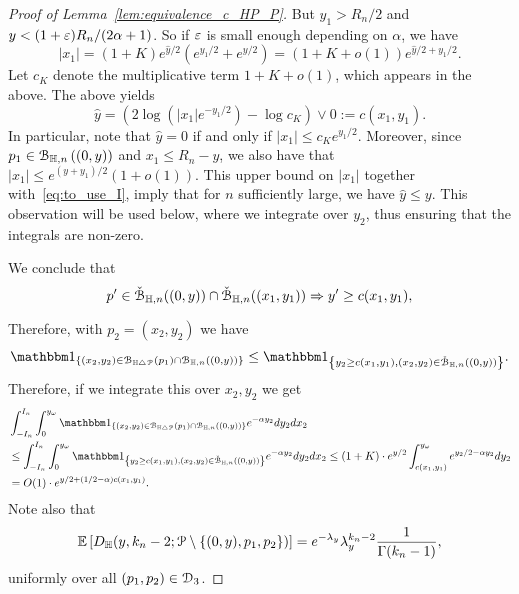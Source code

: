 \begin{proof}[Proof of Lemma~\ref{lem:equivalence_c_HP_P}]
But $y_1 > R_n/2$ and $y< (1+\varepsilon) R_n /(2\alpha +1)$. So if $\varepsilon$ is small enough depending on $\alpha$, we have 
$$ |x_1| =(1+K) e^{\hat{y}/2} \left( e^{y_1/2} + e^{y/2} \right) = (1+K+o(1))e^{\hat{y}/2 + y_1/2}. $$
Let $c_K$ denote the multiplicative term $1+ K+o(1)$, which appears in the above.
The above yields
\begin{equation} \label{eq:to_use_I}
\hat{y}= \left(2 \log(|x_1|e^{-y_1/2}) - \log c_K \right) \vee 0 := c(x_1,y_1). 
\end{equation}
In particular, note that $\hat{y} = 0$ if and only if $|x_1| \leq c_K e^{y_1/2}$.  
Moreover, since $p_1 \in {\mathcal B}_{\mathbb{H},n}\left((0,y)\right)$ and $x_1 \leq R_n - y$, we also have that 
$|x_1| \leq e^{(y+y_1)/2} (1+o(1))$. This upper bound on $|x_1|$ together with~\eqref{eq:to_use_I}, imply that for $n$ sufficiently large, we have $\hat{y} \leq y$. This observation will be used below, where 
we integrate over $y_2$, thus ensuring that the integrals are non-zero. 

We conclude that 
\begin{equation*}\label{eq:intersex_approx}
	p^\prime \in \check{{\mathcal B}}_{\mathbb{H},n}((0,y))\cap \check{{\mathcal B}}_{\mathbb{H},n}((x_1,y_1)) \Rightarrow y^\prime \ge c(x_1,y_1),
\end{equation*}

Therefore, with $p_2 = (x_2,y_2)$ we have 
\begin{equation} \label{eq:symdiff_loc}
\begin{split} 
 \ind{(x_2,y_2) \in \BallSym{p_1}\cap \BallHyp{(0,y)}} \leq \ind{y_2 \geq c(x_1,y_1), (x_2,y_2) \in \FatBallHyp{(0,y)}}.
\end{split}
\end{equation}
Therefore, if we integrate this over $x_2, y_2$ we get 
\begin{equation*}
\begin{split}
&\int_{-I_n}^{I_n} \int_{0}^{y_\omega}  \ind{(x_2,y_2) \in \BallSym{p_1}\cap \BallHyp{(0,y)}}  
e^{-\alpha y_2} dy_2 dx_2\\
&  \leq 
\int_{-I_n}^{I_n} \int_{0}^{y_\omega}  \ind{y_2 \geq c(x_1,y_1), (x_2,y_2) \in \FatBallHyp{(0,y)}}  
e^{-\alpha y_2} dy_2 dx_2 
\leq 
(1+K) \cdot e^{y/2} \int_{c(x_1,y_1)}^{y_\omega} e^{y_2/2 - \alpha y_2} dy_2 \\
&=O(1) \cdot e^{y/2 + (1/2 -\alpha) c(x_1,y_1)}.
\end{split}
\end{equation*}
Note also that 
$$ {\mathbb E} \left[ D_{\mathbb{H}} (y,k_n-2;{\mathcal P} \setminus \{ (0,y),p_1,p_2\}) \right] =e^{-\lambda_y} \lambda_y^{k_n-2} \frac{1}{\Gamma (k_n-1)},$$
uniformly over all $(p_1, p_2) \in \mathcal{D}_{3}$. 


\end{proof}

